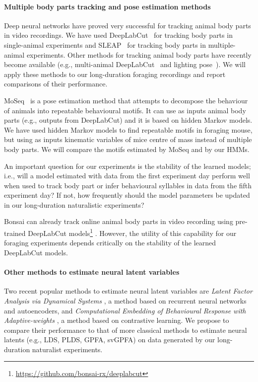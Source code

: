 \paragraph{Multiple body parts tracking and pose estimation methods}

Deep neural networks have proved very successful for tracking animal body parts
in video recordings.
%
We have used DeepLabCut~\citep{mathisEtAl18} for tracking body parts in
single-animal experiments and SLEAP~\citep{pereiraEtAl22} for tracking body
parts in multiple-animal experiments. Other methods for tracking animal body parts have
recently become available (e.g., multi-animal DeepLabCut~\citep{lauerEtAl22}
and lighting pose~\citep{bidermanEtAl23}).
%
We will apply these methods to our long-duration foraging recordings and report
comparisons of their performance.

MoSeq~\cite{wiltschkoEtAl15} is a pose estimation method that attempts to
decompose the behaviour of animals into
repeatable behavioural motifs. It can use as inputs animal body parts (e.g.,
outputs from DeepLabCut) and it is based on hidden Markov models. We have used
hidden Markov models to find repeatable motifs in foraging mouse, but using
as inputs kinematic variables of mice centre of mass instead of multiple body
parts.
%
We will compare the motifs estimated by MoSeq and by our HMMs.

An important question for our experiments is the stability of the learned
models; i.e., will a model estimated with data from the first experiment day
perform well when used to track body part or infer behavioural syllables in data
from the fifth experiment day? If not, how frequently should the model
parameters be updated in our long-duration naturalistic experiments?

Bonsai can already track online animal body parts in video recording using
pre-trained DeepLabCut
models\footnote{\url{https://github.com/bonsai-rx/deeplabcut}}
\citep{kaneEtAl20}. However, the utility of this capability for our foraging
experiments depends critically on the stability of the learned DeepLabCut
models.

\paragraph{Other methods to estimate neural latent variables}

Two recent popular methods to estimate neural latent variables are \emph{Latent
Factor Analysis via Dynamical Systems} \citep[LFADS][]{pandarinathEtAl18}, a
method based on recurrent neural networks and autoencoders, and
\emph{Computational Embedding of Behavioural Response with Adaptive-weights}
\citep[CEBRA]{schneiderEtAl23}, a method based on contrastive learning. We
propose to compare their performance to that of more classical methods to
estimate neural latents (e.g., LDS, PLDS, GPFA, svGPFA) on data generated by
our long-duration naturalist experiments.

